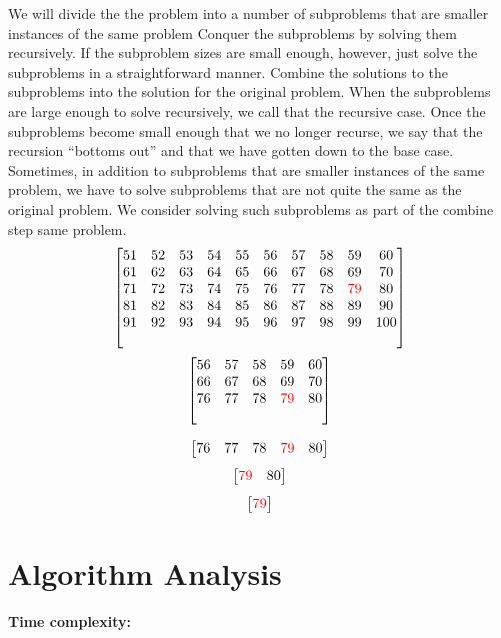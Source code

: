 \documentclass[conference]{IEEEtran}
\begin{document}
We will divide the the problem into a number of subproblems that are smaller instances of the same problem Conquer the subproblems by solving them recursively. If the subproblem sizes are
small enough, however, just solve the subproblems in a straightforward manner.
Combine the solutions to the subproblems into the solution for the original problem.
When the subproblems are large enough to solve recursively, we call that the recursive case. Once the subproblems become small enough that we no longer recurse,
we say that the recursion “bottoms out” and that we have gotten down to the base
case. Sometimes, in addition to subproblems that are smaller instances of the same
problem, we have to solve subproblems that are not quite the same as the original
problem. We consider solving such subproblems as part of the combine step
same problem. \\

$$
\begin{bmatrix}
51 & 52 & 53 & 54 & 55 & 56 & 57 & 58 & 59 & 60 \\ 
61 & 62 & 63 & 64 & 65 & 66 & 67 & 68 & 69 & 70 \\
71 & 72 & 73 & 74 & 75 & 76 & 77 & 78 & \color{red}79 & 80 \\
81 & 82 & 83 & 84 & 85 & 86 & 87 & 88 & 89 & 90 \\
91 & 92 & 93 & 94 & 95 & 96 & 97 & 98 & 99 & 100 \\ 
\quad
\end{bmatrix}
$$
$$
\begin{bmatrix}
56 & 57 & 58 & 59 & 60 \\
66 & 67 & 68 & 69 & 70 \\
76 & 77 & 78 & \color{red}79 & 80 \\
\quad
\end{bmatrix}
$$

$$
\begin{bmatrix}
76 & 77 & 78 & \color{red}79 & 80 \\
\end{bmatrix}
$$
$$
\begin{bmatrix}
\color{red}79 & 80 \\ 
\end{bmatrix} 
$$
$$
\begin{bmatrix}
\color{red}79 \\
\end{bmatrix}
$$


\section{Algorithm Analysis}
\textbf{Time complexity:}
\end{document}
